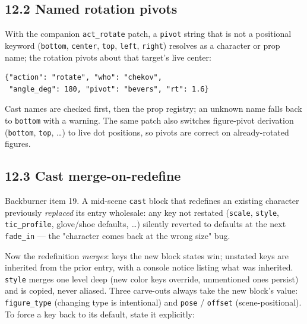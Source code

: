 \documentclass[
  11pt,
]{book}
\begin{document}
\subsection{\texorpdfstring{12.2 Named rotation
pivots}{12.2 Named rotation pivots}}\label{named-rotation-pivots}

With the companion \texttt{act\_rotate} patch, a \texttt{pivot}
string that is not a positional keyword (\texttt{bottom},
\texttt{center}, \texttt{top}, \texttt{left}, \texttt{right})
resolves as a character or prop name; the rotation pivots about that
target's live center:

\begin{verbatim}
{"action": "rotate", "who": "chekov",
 "angle_deg": 180, "pivot": "bevers", "rt": 1.6}
\end{verbatim}

Cast names are checked first, then the prop registry; an unknown name
falls back to \texttt{bottom} with a warning. The same patch also
switches figure-pivot derivation (\texttt{bottom}, \texttt{top},
\ldots) to live dot positions, so pivots are correct on
already-rotated figures.

\subsection{\texorpdfstring{12.3 Cast
merge-on-redefine}{12.3 Cast merge-on-redefine}}\label{cast-merge-on-redefine}

Backburner item 19. A mid-scene \texttt{cast} block that redefines an
existing character previously \emph{replaced} its entry wholesale:
any key not restated (\texttt{scale}, \texttt{style},
\texttt{tic\_profile}, glove/shoe defaults, \ldots) silently reverted
to defaults at the next \texttt{fade\_in} --- the "character comes
back at the wrong size" bug.

Now the redefinition \emph{merges}: keys the new block states win;
unstated keys are inherited from the prior entry, with a console
notice listing what was inherited. \texttt{style} merges one level
deep (new color keys override, unmentioned ones persist) and is
copied, never aliased. Three carve-outs always take the new block's
value: \texttt{figure\_type} (changing type is intentional) and
\texttt{pose} / \texttt{offset} (scene-positional). To force a key
back to its default, state it explicitly:
\end{document}
